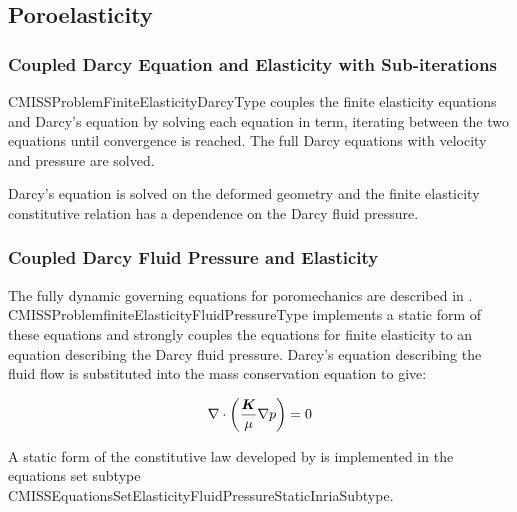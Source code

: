\subsection{Poroelasticity}

\subsubsection{Coupled Darcy Equation and Elasticity with Sub-iterations}

CMISSProblemFiniteElasticityDarcyType couples the finite elasticity equations and
Darcy's equation by solving each equation in term, iterating between the two equations
until convergence is reached. The full Darcy equations with velocity and pressure
are solved.

Darcy's equation is solved on the deformed geometry and the finite elasticity
constitutive relation has a dependence on the Darcy fluid pressure.

\subsubsection{Coupled Darcy Fluid Pressure and Elasticity}

The fully dynamic governing equations for poromechanics are described in \cite{coussy:2004}.
CMISSProblemfiniteElasticityFluidPressureType implements a static form of these equations
and strongly couples the equations
for finite elasticity to an equation describing the Darcy fluid pressure. Darcy's
equation describing the fluid flow is substituted into the mass conservation
equation to give:

\begin{equation}
\nabla \cdot \left(\frac{\boldsymbol{K}}{\mu} \nabla p\right) = 0
\end{equation}

A static form of the constitutive law developed by \cite{chapelle:2010} is implemented in the equations
set subtype CMISSEquationsSetElasticityFluidPressureStaticInriaSubtype.
